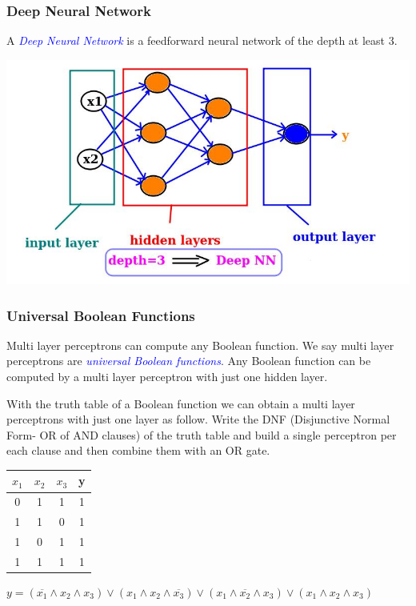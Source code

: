 \documentclass[12pt,aspectratio=169]{beamer}
\begin{document}
\begin{frame}
\frametitle{Deep Neural Network}
A \textcolor{blue}{\em Deep Neural Network} is a feedforward neural network of the depth at least 3.
\end{frame}

\begin{frame}
\begin{center}
\includegraphics[scale=0.6]{deep}
\end{center}
\end{frame}

\begin{frame}
\frametitle{Universal Boolean Functions}
Multi layer perceptrons can compute any Boolean function. We say multi layer perceptrons are \textcolor{blue}{\em universal Boolean functions}. Any Boolean function can be computed by a multi layer perceptron with just one hidden layer.
\end{frame}

\begin{frame}
With the truth table of a Boolean function we can obtain a multi layer perceptrons with just one layer as follow. Write the DNF (Disjunctive Normal Form- OR of AND clauses) of the truth table and build a single perceptron per each clause and then combine them with an OR gate. 
\end{frame}

\begin{frame}
\begin{table}[h!]
\centering
 \begin{tabular}{||c c c c||} 
 \hline
 $x_1$ & $x_2$ & $x_3$ & y \\ [0.5ex] 
 \hline\hline
 0 & 1 & 1 & 1 \\ 
 1 & 1 & 0 & 1 \\
 1 & 0 & 1 & 1 \\
 1 & 1 & 1 & 1 \\ [1ex] 
 \hline
 \end{tabular}
\end{table}
$y=(\overline{x_1}\wedge x_2 \wedge x_3)\vee (x_1\wedge x_2\wedge \overline{x_3})\vee (x_1\wedge\overline{x_2}\wedge x_3)\vee (x_1\wedge x_2 \wedge x_3)$
\end{frame}
\end{document}
